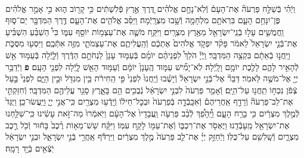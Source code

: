 \documentclass[twoside, openany, parskip=half, 11pt]{book}
\begin{document}
\begin{footnotesize}
\begin{multicols}{2}
\\
וַיְֿהִ֗י בְּֿשַׁלַּ֣ח פַּרְעֹה֘ אֶת־הָעָם֒ וְֿלֹֽא־נָחָ֣ם אֱלֹהִ֗ים דֶּ֚רֶךְ אֶ֣רֶץ פְּֿלִשְׁתִּ֔ים כִּ֥י קָר֖וֹב ה֑וּא כִּ֣י אָמַ֣ר אֱלֹהִ֗ים פֶּן־יִנָּחֵ֥ם הָעָ֛ם בִּרְאֹתָ֥ם מִלְחָמָ֖ה וְֿשָׁ֥בוּ מִצְרָֽיְֿמָה׃ וַיַּסֵּ֨ב אֱלֹהִ֧ים אֶת־הָעָ֛ם דֶּ֥רֶךְ הַמִּדְבָּ֖ר יַם־ס֑וּף וַֽחֲמֻשִׁ֛ים עָל֥וּ בְֿנֵֽי־יִשְׂרָאֵ֖ל מֵאֶ֥רֶץ מִצְרָֽיִם׃ וַיִּקַּ֥ח מֹשֶׁ֛ה אֶת־עַצְמ֥וֹת יוֹסֵ֖ף עִמּ֑וֹ כִּי֩ הַשְׁבֵּ֨עַ הִשְׁבִּ֜יעַ אֶת־בְּֿנֵ֤י יִשְׂרָאֵל֙ לֵאמֹ֔ר פָּקֹ֨ד יִפְקֹ֤ד אֱלֹהִים֙ אֶתְכֶ֔ם וְֿהַֽעֲלִיתֶ֧ם אֶת־עַצְמֹתַ֛י מִזֶּ֖ה אִתְּֿכֶֽם׃
וַיִּסְע֖וּ מִסֻּכֹּ֑ת וַיַּֽחֲנ֣וּ בְֿאֵתָ֔ם בִּקְצֵ֖ה הַמִּדְבָּֽר׃ וַֽיְֿיָ֡ הֹלֵךְ֩ לִפְנֵיהֶ֨ם יוֹמָ֜ם בְּֿעַמּ֤וּד עָנָן֙ לַנְחֹתָ֣ם הַדֶּ֔רֶךְ וְֿלַ֛יְֿלָה בְּֿעַמּ֥וּד אֵ֖שׁ לְֿהָאִ֣יר לָהֶ֑ם לָלֶ֖כֶת יוֹמָ֥ם וָלָֽיְֿלָה׃ לֹֽא־יָמִ֞ישׁ עַמּ֤וּד הֶֽעָנָן֙ יוֹמָ֔ם וְֿעַמּ֥וּד הָאֵ֖שׁ לָ֑יְֿלָה לִפְנֵ֖י הָעָֽם׃ \textbf{פ}
וַיְֿדַבֵּ֥ר יְיָ֖ אֶל־מֹשֶׁ֥ה לֵּאמֹֽר׃ דַּבֵּר֘ אֶל־בְּֿנֵ֣י יִשְׂרָאֵל֒ וְֿיָשֻׁ֗בוּ וְֿיַֽחֲנוּ֙ לִפְנֵי֙ פִּ֣י הַֽחִירֹ֔ת בֵּ֥ין מִגְדֹּ֖ל וּבֵ֣ין הַיָּ֑ם לִפְנֵי֙ בַּ֣עַל צְֿפֹ֔ן נִכְח֥וֹ תַֽחֲנ֖וּ עַל־הַיָּֽם׃ וְֿאָמַ֤ר פַּרְעֹה֙ לִבְנֵ֣י יִשְׂרָאֵ֔ל נְֿבֻכִ֥ים הֵ֖ם בָּאָ֑רֶץ סָגַ֥ר עֲלֵיהֶ֖ם הַמִּדְבָּֽר׃ וְֿחִזַּקְתִּ֣י אֶת־לֵב־פַּרְעֹה֘ וְֿרָדַ֣ף אַֽחֲרֵיהֶם֒ וְֿאִכָּֽבְֿדָ֤ה בְּֿפַרְעֹה֙ וּבְכׇל־חֵיל֔וֹ וְֿיָֽדְֿע֥וּ מִצְרַ֖יִם כִּֽי־אֲנִ֣י יְיָ֑ וַיַּֽעֲשׂוּ־כֵֽן׃
וַיֻּגַּד֙ לְֿמֶ֣לֶךְ מִצְרַ֔יִם כִּ֥י בָרַ֖ח הָעָ֑ם וַיֵּֽ֠הָפֵ֠ךְ לְֿבַ֨ב פַּרְעֹ֤ה וַֽעֲבָדָיו֙ אֶל־הָעָ֔ם וַיֹּֽאמְֿרוּ֙ מַה־זֹּ֣את עָשִׂ֔ינוּ כִּֽי־שִׁלַּ֥חְנוּ אֶת־יִשְׂרָאֵ֖ל מֵֽעָבְֿדֵֽנוּ׃ וַיֶּאְסֹ֖ר אֶת־רִכְבּ֑וֹ וְֿאֶת־עַמּ֖וֹ לָקַ֥ח עִמּֽוֹ׃ וַיִּקַּ֗ח שֵׁשׁ־מֵא֥וֹת רֶ֨כֶב֙ בָּח֔וּר וְֿכֹ֖ל רֶ֣כֶב מִצְרָ֑יִם וְֿשָֽׁלִשִׁ֖ם עַל־כֻּלּֽוֹ׃ וַיְֿחַזֵּ֣ק יְיָ֗ אֶת־לֵ֤ב פַּרְעֹה֙ מֶ֣לֶךְ מִצְרַ֔יִם וַיִּרְדֹּ֕ף אַֽחֲרֵ֖י בְּֿנֵ֣י יִשְׂרָאֵ֑ל וּבְנֵ֣י יִשְׂרָאֵ֔ל יֹֽצְֿאִ֖ים בְּֿיָ֥ד רָמָֽה׃


\end{multicols}
\end{footnotesize}
\end{document}
